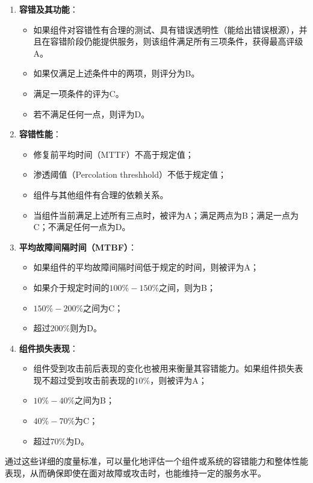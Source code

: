 \documentclass{article}
\begin{document}
\begin{enumerate}
	\item 
	\textbf{容错及其功能}：
	\begin{itemize}
		\item 如果组件对容错性有合理的测试、具有错误透明性（能给出错误根源），并且在容错阶段仍能提供服务，则该组件满足所有三项条件，获得最高评级A。
		\item 如果仅满足上述条件中的两项，则评分为B。
		\item 满足一项条件的评为C。
		\item 若不满足任何一点，则评为D。
	\end{itemize}
	
	\item 
	\textbf{容错性能}：
	\begin{itemize}
		\item 修复前平均时间（MTTF）不高于规定值；
		\item 渗透阈值（Percolation threshhold）不低于规定值；
		\item 组件与其他组件有合理的依赖关系。
		\item 当组件当前满足上述所有三点时，被评为A；满足两点为B；满足一点为C；不满足任何一点为D。
	\end{itemize}
	
	\item 
	\textbf{平均故障间隔时间（MTBF）}：
	\begin{itemize}
		\item 如果组件的平均故障间隔时间低于规定的时间，则被评为A；
		\item 如果介于规定时间的$100\%-150\%$之间，则为B；
		\item $150\%-200\%$之间为C；
		\item 超过$200\%$则为D。
	\end{itemize}
	
	\item
	\textbf{组件损失表现}：
	\begin{itemize}
		\item 组件受到攻击前后表现的变化也被用来衡量其容错能力。如果组件损失表现不超过受到攻击前表现的$10\%$，则被评为A；
		\item $10\%-40\%$之间为B；
		\item $40\%-70\%$为C；
		\item 超过$70\%$为D。
	\end{itemize}
\end{enumerate}

通过这些详细的度量标准，可以量化地评估一个组件或系统的容错能力和整体性能表现，从而确保即使在面对故障或攻击时，也能维持一定的服务水平。
\end{document}
